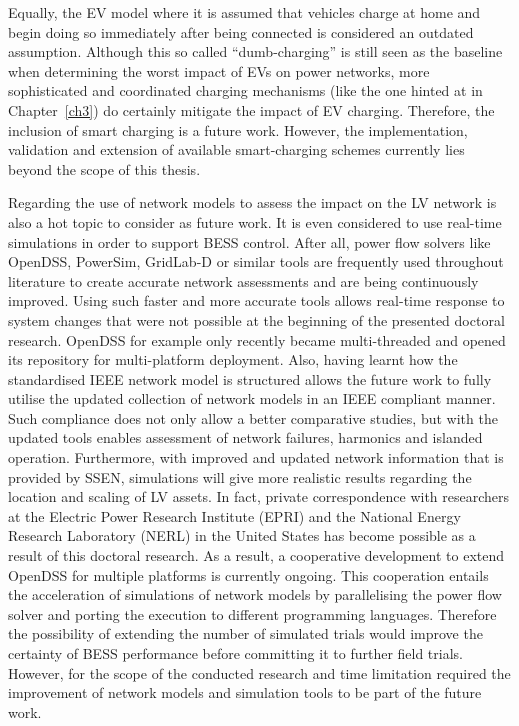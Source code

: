 Equally, the EV model where it is assumed that vehicles charge at home and begin doing so immediately after being connected is considered an outdated assumption.
Although this so called ``dumb-charging'' is still seen as the baseline when determining the worst impact of EVs on power networks, more sophisticated and coordinated charging mechanisms (like the one hinted at in Chapter~\ref{ch3}) do certainly mitigate the impact of EV charging.
Therefore, the inclusion of smart charging is a future work.
However, the implementation, validation and extension of available smart-charging schemes currently lies beyond the scope of this thesis.

Regarding the use of network models to assess the impact on the LV network is also a hot topic to consider as future work.
It is even considered to use real-time simulations in order to support BESS control.
After all, power flow solvers like OpenDSS, PowerSim, GridLab-D or similar tools are frequently used throughout literature to create accurate network assessments and are being continuously improved.
Using such faster and more accurate tools allows real-time response to system changes that were not possible at the beginning of the presented doctoral research.
OpenDSS for example only recently became multi-threaded and opened its repository for multi-platform deployment.
Also, having learnt how the standardised IEEE network model is structured allows the future work to fully utilise the updated collection of network models in an IEEE compliant manner.
Such compliance does not only allow a better comparative studies, but with the updated tools enables assessment of network failures, harmonics and islanded operation.
Furthermore, with improved and updated network information that is provided by SSEN, simulations will give more realistic results regarding the location and scaling of LV assets.
In fact, private correspondence with researchers at the Electric Power Research Institute (EPRI) and the National Energy Research Laboratory (NERL) in the United States has become possible as a result of this doctoral research.
As a result, a cooperative development to extend OpenDSS for multiple platforms is currently ongoing.
This cooperation entails the acceleration of simulations of network models by parallelising the power flow solver and porting the execution to different programming languages.
Therefore the possibility of extending the number of simulated trials would improve the certainty of BESS performance before committing it to further field trials.
However, for the scope of the conducted research and time limitation required the improvement of network models and simulation tools to be part of the future work.

